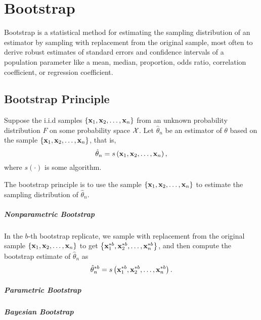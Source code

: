 \chapter{Bootstrap}

Bootstrap is a statistical method for estimating the sampling distribution of an estimator by sampling with replacement from the original sample, most often to derive robust estimates of standard errors and confidence intervals of a population parameter like a mean, median, proportion, odds ratio, correlation coefficient, or regression coefficient.

\section{Bootstrap Principle}

Suppose the i.i.d samples $\left\{{\bf x}_{1},{\bf x}_{2},\ldots,{\bf x}_{n}\right\}$ from an unknown probability distribution $F$ on some probability space ${\mathcal X}$. Let $\hat{\theta}_{n}$ be an estimator of $\theta$ based on the sample $\left\{{\bf x}_{1},{\bf x}_{2},\ldots,{\bf x}_{n}\right\}$, that is,
\begin{equation*}
	\hat{\theta}_{n}=s\left({\bf x}_{1},{\bf x}_{2},\ldots,{\bf x}_{n}\right),
\end{equation*}
where $s(\cdot)$ is some algorithm.

The bootstrap principle is to use the sample $\left\{{\bf x}_{1},{\bf x}_{2},\ldots,{\bf x}_{n}\right\}$ to estimate the sampling distribution of $\hat{\theta}_{n}$.

\paragraph{Nonparametric Bootstrap}

In the $b$-th bootstrap replicate, we sample with replacement from the original sample $\left\{{\bf x}_{1},{\bf x}_{2},\ldots,{\bf x}_{n}\right\}$ to get $\left\{{\bf x}_{1}^{*b},{\bf x}_{2}^{*b},\ldots,{\bf x}_{n}^{*b}\right\}$, and then compute the bootstrap estimate of $\hat{\theta}_{n}$ as
\begin{equation}
	\hat{\theta}_{n}^{*b}=s\left({\bf x}_{1}^{*b},{\bf x}_{2}^{*b},\ldots,{\bf x}_{n}^{*b}\right).
\end{equation}

\paragraph{Parametric Bootstrap}

\paragraph{Bayesian Bootstrap}

